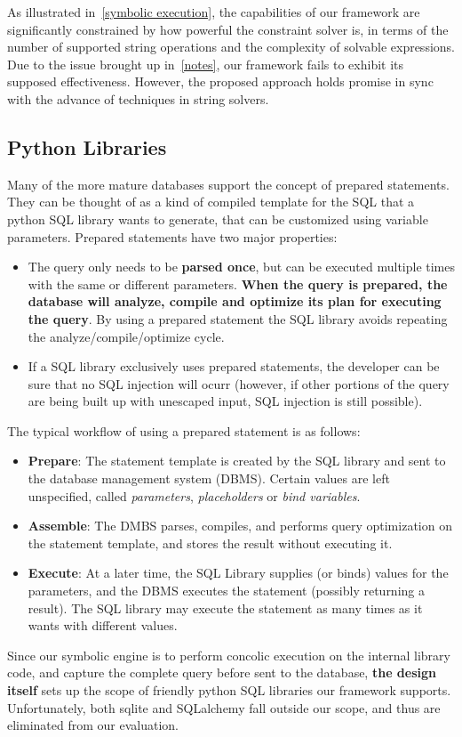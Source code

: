 \documentclass[conference]{IEEEtran}
\begin{document}
As illustrated in~\ref{symbolic execution}, the capabilities of our framework are significantly constrained by how powerful the constraint solver is, in terms of the number of supported string operations and the complexity of solvable expressions. Due to the issue brought up in~\ref{notes}, our framework fails to exhibit its supposed effectiveness. However, the proposed approach holds promise in sync with the advance of techniques in string solvers.

\subsection{Python Libraries}
Many of the more mature databases support the concept of prepared statements. They can be thought of as a kind of compiled template for the SQL that a python SQL library wants to generate, that can be customized using variable parameters. Prepared statements have two major properties:
\begin{itemize}
\item The query only needs to be {\bf parsed once}, but can be executed multiple times with the same or different parameters. {\bf When the query is prepared, the database will analyze, compile and optimize its plan for executing the query}. By using a prepared statement the SQL library avoids repeating the analyze/compile/optimize cycle.
\item If a SQL library exclusively uses prepared statements, the developer can be sure that no SQL injection will ocurr (however, if other portions of the query are being built up with unescaped input, SQL injection is still possible).
\end{itemize}
The typical workflow of using a prepared statement is as follows:
\begin{itemize}
\item {\bf Prepare}:
The statement template is created by the SQL library and sent to the database management system (DBMS). Certain values are left unspecified, called \emph{parameters}, \emph{placeholders} or \emph{bind variables}.
\item {\bf Assemble}:
The DMBS parses, compiles, and performs query optimization on the statement template, and stores the result without executing it.
\item {\bf Execute}:
At a later time, the SQL Library supplies (or binds) values for the parameters, and the DBMS executes the statement (possibly returning a result). The SQL library may execute the statement as many times as it wants with different values.
\end{itemize}
Since our symbolic engine is to perform concolic execution on the internal library code, and capture the complete query before sent to the database, {\bf the design itself} sets up the scope of friendly python SQL libraries our framework supports. Unfortunately, both sqlite and SQLalchemy fall outside our scope, and thus are eliminated from our evaluation.
\end{document}
